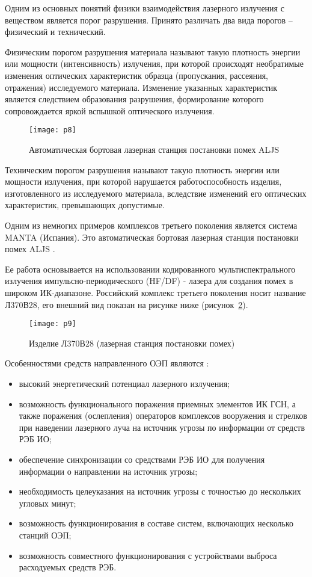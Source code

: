 Одним из основных понятий физики взаимодействия лазерного излучения с веществом является порог разрушения. Принято различать два вида порогов – физический и технический. 

Физическим порогом разрушения материала называют такую плотность энергии или мощности (интенсивность) излучения, при которой происходят необратимые изменения оптических характеристик образца (пропускания, рассеяния, отражения) исследуемого материала. Изменение указанных характеристик является следствием образования разрушения, формирование которого сопровождается яркой вспышкой оптического излучения. 

\begin{figure}[ht]
	\centering
	\texttt{[image: p8]} 
	\caption{Автоматическая бортовая лазерная станция постановки помех ALJS}
	\label{fig:p8}
\end{figure}

Техническим порогом разрушения называют такую плотность энергии или мощности излучения, при которой нарушается работоспособность изделия, изготовленного из исследуемого материала, вследствие изменений его оптических характеристик, превышающих допустимые.

Одним из немногих примеров комплексов третьего поколения является система MANTA (Испания). Это автоматическая бортовая лазерная станция постановки помех ALJS \cite[]{manta}.

Ее работа основывается на использовании кодированного мультиспектрального излучения импульсно-периодического (HF/DF) - лазера для создания помех в широком ИК-диапазоне.
Российский комплекс третьего поколения носит название Л370В28, его внешний вид показан на рисунке ниже (рисунок~\ref{fig:p9}). 

\begin{figure}[ht]
	\centering
	\texttt{[image: p9]} 
	\caption{Изделие Л370В28 (лазерная станция постановки помех)}
	\label{fig:p9}
\end{figure}

Особенностями средств направленного ОЭП являются \cite[]{ForeignMilitary}:
\begin{itemize}
	\item высокий энергетический потенциал лазерного излучения;
	\item возможность функционального поражения приемных элементов ИК ГСН, а также поражения (ослепления) операторов комплексов вооружения и стрелков при наведении лазерного луча на источник угрозы по информации от средств РЭБ ИО;
	\item обеспечение синхронизации со средствами РЭБ ИО для получения информации о направлении на источник угрозы;
	\item необходимость целеуказания на источник угрозы с точностью до нескольких угловых минут;
	\item возможность функционирования в составе систем, включающих несколько станций ОЭП;
	\item возможность совместного функционирования с устройствами выброса расходуемых средств РЭБ.
\end{itemize}



